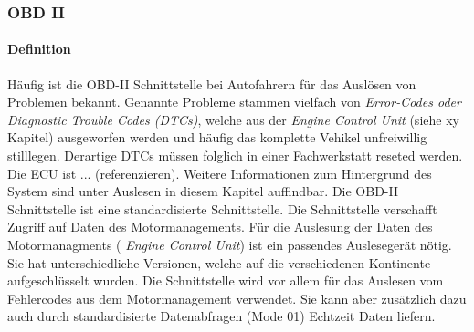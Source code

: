 \subsubsection{OBD II}
\label{subsec:obd2}

\paragraph{Definition}
Häufig ist die OBD-II Schnittstelle bei Autofahrern für das Auslösen von Problemen bekannt. Genannte Probleme stammen vielfach von \textit{Error-Codes oder Diagnostic Trouble Codes (DTCs)}, welche aus der \textit{Engine Control Unit} (siehe xy Kapitel) ausgeworfen werden und häufig das komplette Vehikel unfreiwillig stilllegen. Derartige DTCs müssen folglich in einer Fachwerkstatt reseted werden. Die ECU ist ... (referenzieren).  Weitere Informationen zum Hintergrund des System sind unter Auslesen in diesem Kapitel auffindbar. 
Die OBD-II Schnittstelle ist eine standardisierte Schnittstelle. Die Schnittstelle verschafft Zugriff auf Daten des Motormanagements. Für die Auslesung der Daten des Motormanagments ( \textit{Engine Control Unit}) ist ein passendes Auslesegerät nötig. Sie hat unterschiedliche Versionen, welche auf die verschiedenen Kontinente aufgeschlüsselt wurden. Die Schnittstelle wird vor allem für das Auslesen vom Fehlercodes aus dem Motormanagement verwendet. Sie kann aber zusätzlich dazu auch durch standardisierte Datenabfragen (Mode 01) Echtzeit Daten liefern.

